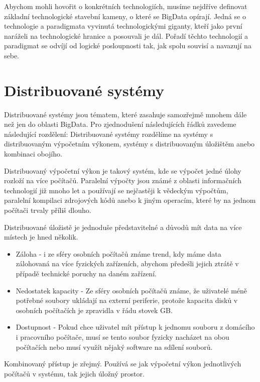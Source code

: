 
Abychom mohli hovořit o konkrétních technologiích, musíme nejdříve definovat základní technologické stavební kameny, o které se BigData opírají. Jedná se o technologie a paradigmata vyvinutá technologickými giganty, kteří jako první naráželi na technologické hranice a posouvali je dál. Pořadí těchto technologií a paradigmat se odvíjí od logické posloupnosti tak, jak spolu souvisí a navazují na sebe.    

\section{Distribuované systémy}
Distribuované systémy jsou tématem, které zasahuje samozřejmě mnohem dále než jen do oblasti BigData. Pro zjednodušení následujících řádků zavedeme následující rozdělení: Distribuované systémy rozdělíme na systémy s distribuovaným výpočetním výkonem, systémy s distribuovaným úložištěm anebo kombinaci obojího. 

Distribuovaný výpočetní výkon je takový systém, kde se výpočet jedné úlohy rozloží na více počítačů. Paralelní výpočty jsou známé z oblasti informačních technologií již mnoho let a používají se nejčastěji k vědeckým výpočtům, paralelní kompilaci zdrojových kódů anebo k jiným operacím, které by na jednom počítači trvaly příliš dlouho. 

Distribuované úložistě je jednoduše představitelné a důvodů mít data na více místech je hned několik.
\begin{itemize}
\item Záloha - i ze sféry osobních počítačů známe trend, kdy máme data zálohovaná na více fyzických zařízeních, abychom předešli jejich ztrátě v případě technické poruchy na daném zařízení. 

\item Nedostatek kapacity - Ze sféry osobních počítačů známe, že uživatelé méně potřebné soubory ukládají na externí periferie, protože kapacita disků v osobních počítačích je zpravidla v řádu stovek GB.

\item Dostupnost - Pokud chce uživatel mít přístup k jednomu souboru z domácího i pracovního počítače, musí se tento soubor fyzicky nacházet na obou počítačích nebo musí využít nějaký software na sdílení souborů. 

\end{itemize}

Kombinovaný přístup je zřejmý. Používá se jak výpočetní výkon jednotlivých počítačů v systému, tak jejich úložný prostor. 

